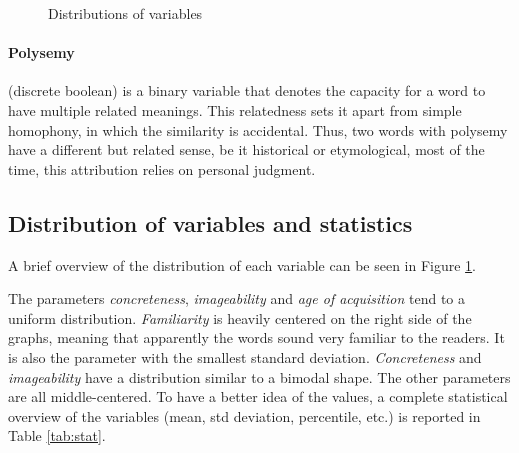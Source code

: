 \documentclass[a4paper,11pt,dvipsnames]{article}
\begin{document}
\begin{figure}[ht]
\caption{Distributions of variables}\label{fig:dis}

\end{figure}

\paragraph{Polysemy} (discrete boolean) is a binary variable that denotes the capacity for a word to have multiple related meanings. This relatedness sets it apart from simple homophony, in which the similarity is accidental. Thus, two words with polysemy have a different but related sense, be it historical or etymological, most of the time, this attribution relies on personal judgment.



\subsection[Distributions and statistics]{Distribution of variables and statistics}


A brief overview of the distribution of each variable can be seen in Figure \ref{fig:dis}. 



The parameters \textit{concreteness}, \textit{imageability} and \textit{age of acquisition} tend to a uniform distribution. \textit{Familiarity} is heavily centered on the right side of the graphs, meaning that apparently the words sound very familiar to the readers. It is also the parameter with the smallest standard deviation. \textit{Concreteness} and \textit{imageability} have a distribution similar to a bimodal shape. The other parameters are all middle-centered. To have a better idea of the values, a complete statistical overview of the variables (mean, std deviation, percentile, etc.) is reported in Table \ref{tab:stat}. 
\end{document}
